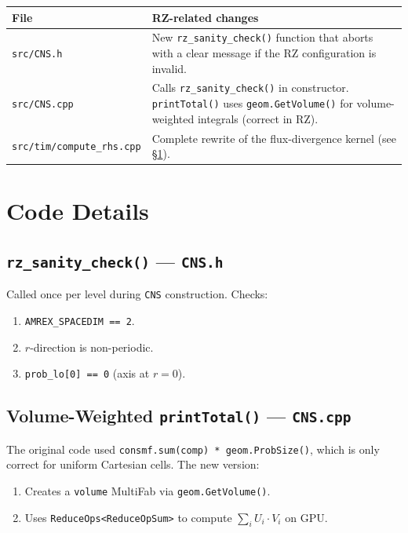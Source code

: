 \documentclass[11pt,a4paper]{article}
\begin{document}
\begin{tabular}{p{4cm} p{10cm}}
\toprule
\textbf{File} & \textbf{RZ-related changes} \\
\midrule
\texttt{src/CNS.h}
  & New \texttt{rz\_sanity\_check()} function that aborts with a clear
    message if the RZ configuration is invalid. \\
\texttt{src/CNS.cpp}
  & Calls \texttt{rz\_sanity\_check()} in constructor.
    \texttt{printTotal()} uses \texttt{geom.GetVolume()} for
    volume-weighted integrals (correct in RZ). \\
\texttt{src/tim/compute\_rhs.cpp}
  & Complete rewrite of the flux-divergence kernel (see \S\ref{sec:divergence}). \\
\bottomrule
\end{tabular}

\section{Code Details}  \label{sec:divergence}

\subsection{\texttt{rz\_sanity\_check()} --- \texttt{CNS.h}}

Called once per level during \texttt{CNS} construction.  Checks:
\begin{enumerate}
  \item \texttt{AMREX\_SPACEDIM == 2}.
  \item $r$-direction is non-periodic.
  \item \texttt{prob\_lo[0] == 0} (axis at $r=0$).
\end{enumerate}

\subsection{Volume-Weighted \texttt{printTotal()} --- \texttt{CNS.cpp}}

The original code used \texttt{consmf.sum(comp) * geom.ProbSize()},
which is only correct for uniform Cartesian cells.  The new version:
\begin{enumerate}
  \item Creates a \texttt{volume} MultiFab via \texttt{geom.GetVolume()}.
  \item Uses \texttt{ReduceOps<ReduceOpSum>} to compute
        $\sum_i U_i \cdot V_i$ on GPU.
\end{enumerate}
\end{document}
